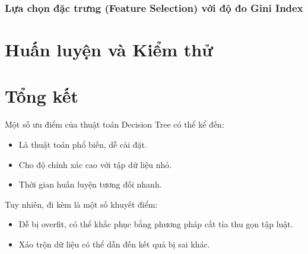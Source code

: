 \documentclass[12pt]{article}
\begin{document}
\subsubsection{Lựa chọn đặc trưng (Feature Selection) với độ đo Gini Index}


\section{Huấn luyện và Kiểm thử}


\section{Tổng kết}
Một số ưu điểm của thuật toán Decision Tree có thể kể đến:
\begin{itemize}
\item Là thuật toán phổ biến, dễ cài đặt.
\item Cho độ chính xác cao với tập dữ liệu nhỏ.
\item Thời gian huấn luyện tương đối nhanh.
\end{itemize}
Tuy nhiên, đi kèm là một số khuyết điểm:
\begin{itemize}
\item Dễ bị overfit, có thể khắc phục bằng phương pháp cắt tỉa thu gọn tập luật.
\item Xáo trộn dữ liệu có thể dẫn đến kết quả bị sai khác.\cite{Kowsari_2019}
\end{itemize}


\cleardoublepage
{}
{}


\end{document}
